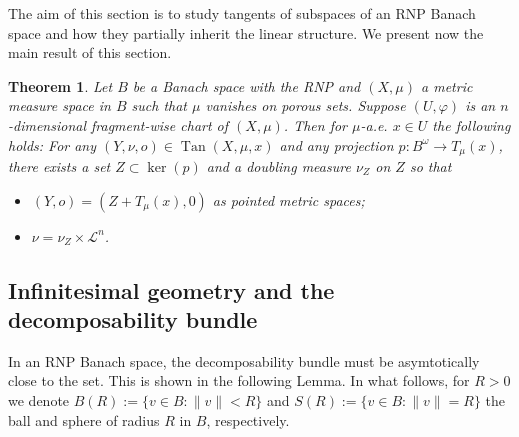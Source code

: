 \documentclass{amsart}
\newtheorem{theorem}{Theorem}[section]
\numberwithin{equation}{section}
\newcommand{\leb}{\mathcal{L}}
\newcommand{\Tan}{\operatorname{Tan}}
\begin{document}
The aim of this section is to study tangents of subspaces of an RNP Banach space and how they partially inherit the linear structure. We present now the main result of this section.
\begin{theorem}\label{thm:tang=prod}
Let $B$ be a Banach space with the RNP and $(X,\mu )$ a metric measure space in $B$ such that $\mu$ vanishes on porous sets. Suppose $(U,\varphi)$ is an $n$-dimensional fragment-wise chart of $(X,\mu)$. Then for $\mu$-a.e. $x\in U$ the following holds: For any $(Y,\nu,o)\in \Tan(X,\mu,x)$ and any projection $p:B^\omega\to T_\mu(x)$, there exists a set $Z\subset \ker(p)$ and a doubling measure $\nu_Z$ on $Z$ so that 
\begin{itemize}
    \item[(i)] $(Y,o)=(Z+T_\mu(x),0)$ as pointed metric spaces;
    \item[(ii)] $\nu=\nu_Z\times \leb^n$.

\end{itemize}
\end{theorem}




\subsection{Infinitesimal geometry and the decomposability bundle}



In an RNP Banach space, the decomposability bundle must be asymtotically close to the set. This is shown in the following Lemma. In what follows, for $R>0$ we denote $B(R):=\{ v\in B:\|v\| < R\}$ and $S(R):=\{v\in B : \|v\|=R\}$ the ball and sphere of radius $R$ in $B$, respectively. 
\end{document}
